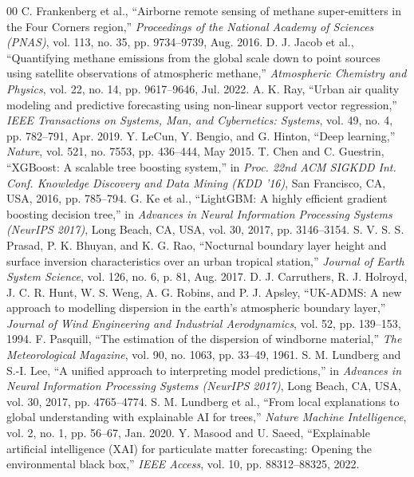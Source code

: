 \documentclass[conference]{IEEEtran}
\begin{document}
\begin{thebibliography}{00}
 C. Frankenberg et al., ``Airborne remote sensing of methane super-emitters in the Four Corners region,'' \textit{Proceedings of the National Academy of Sciences (PNAS)}, vol. 113, no. 35, pp. 9734--9739, Aug. 2016.
 D. J. Jacob et al., ``Quantifying methane emissions from the global scale down to point sources using satellite observations of atmospheric methane,'' \textit{Atmospheric Chemistry and Physics}, vol. 22, no. 14, pp. 9617--9646, Jul. 2022.
 A. K. Ray, ``Urban air quality modeling and predictive forecasting using non-linear support vector regression,'' \textit{IEEE Transactions on Systems, Man, and Cybernetics: Systems}, vol. 49, no. 4, pp. 782--791, Apr. 2019.
 Y. LeCun, Y. Bengio, and G. Hinton, ``Deep learning,'' \textit{Nature}, vol. 521, no. 7553, pp. 436--444, May 2015.
 T. Chen and C. Guestrin, ``XGBoost: A scalable tree boosting system,'' in \textit{Proc. 22nd ACM SIGKDD Int. Conf. Knowledge Discovery and Data Mining (KDD '16)}, San Francisco, CA, USA, 2016, pp. 785--794.
 G. Ke et al., ``LightGBM: A highly efficient gradient boosting decision tree,'' in \textit{Advances in Neural Information Processing Systems (NeurIPS 2017)}, Long Beach, CA, USA, vol. 30, 2017, pp. 3146--3154.
 S. V. S. S. Prasad, P. K. Bhuyan, and K. G. Rao, ``Nocturnal boundary layer height and surface inversion characteristics over an urban tropical station,'' \textit{Journal of Earth System Science}, vol. 126, no. 6, p. 81, Aug. 2017.
 D. J. Carruthers, R. J. Holroyd, J. C. R. Hunt, W. S. Weng, A. G. Robins, and P. J. Apsley, ``UK-ADMS: A new approach to modelling dispersion in the earth's atmospheric boundary layer,'' \textit{Journal of Wind Engineering and Industrial Aerodynamics}, vol. 52, pp. 139--153, 1994.
 F. Pasquill, ``The estimation of the dispersion of windborne material,'' \textit{The Meteorological Magazine}, vol. 90, no. 1063, pp. 33--49, 1961.
 S. M. Lundberg and S.-I. Lee, ``A unified approach to interpreting model predictions,'' in \textit{Advances in Neural Information Processing Systems (NeurIPS 2017)}, Long Beach, CA, USA, vol. 30, 2017, pp. 4765--4774.
 S. M. Lundberg et al., ``From local explanations to global understanding with explainable AI for trees,'' \textit{Nature Machine Intelligence}, vol. 2, no. 1, pp. 56--67, Jan. 2020.
 Y. Masood and U. Saeed, ``Explainable artificial intelligence (XAI) for particulate matter forecasting: Opening the environmental black box,'' \textit{IEEE Access}, vol. 10, pp. 88312--88325, 2022.
\end{thebibliography}
\end{document}
